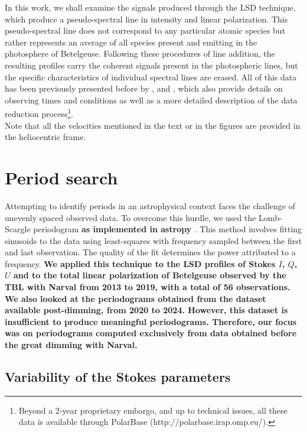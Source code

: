 \documentclass{aa}
\begin{document}
In this work, we shall examine the signals produced through the LSD technique, which produce a pseudo-spectral line in intensity 
and linear polarization. This pseudo-spectral line does not correspond to any particular atomic species but rather represents an average of all species present and emitting in the 
photosphere of Betelgeuse. Following these procedures of line addition, the resulting profiles carry the coherent signals present in the photospheric lines, but the specific characteristics of individual spectral lines are erased. All of this data has been previously presented before by \cite{auriere_discovery_2016}, \cite{mathias_evolution_2018} and 
\cite{lopez_ariste_three-dimensional_2022}, which also provide details on observing times and conditions as well as a more detailed description 
of the data reduction process\footnote[2]{Beyond a 2-year proprietary embargo, and up to technical issues, all these data is available through 
PolarBase (http://polarbase.irap.omp.eu/).}.\\
Note that all the velocities mentioned in the text or in the figures are provided in the heliocentric frame.




\section{Period search}
\label{section 3}


Attempting to identify periods in an astrophysical context faces the challenge of unevenly spaced observed data. To overcome this hurdle, 
we used the Lomb-Scargle periodogram \citep{lomb_least-squares_1976,scargle_studies_1982} \textbf{as implemented in astropy \citep{the_astropy_collaboration_astropy_2018}}. This method involves fitting sinusoids to the data using least-squares with frequency sampled between the first and last observation. The quality of the fit determines the power attributed to a frequency. 
\textbf{We applied this technique to the LSD profiles of Stokes $I$, $Q$, $U$ and to the total linear polarization of Betelgeuse observed by the TBL with Narval from 2013 to 2019, with a total of 56 observations. We also looked at the periodograms obtained from the dataset available post-dimming, from 2020 to 2024. However, this dataset is insufficient to produce meaningful periodograms. Therefore, our focus was on periodograms computed exclusively from data obtained before the great dimming with Narval.}

\subsection{Variability of the Stokes parameters}
\end{document}
